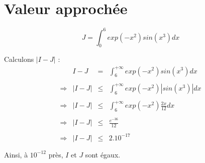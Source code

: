 \section{Valeur approchée}
\[
  J = \int_{0}^{6}exp(-x^2)sin(x^3)dx
\]

Calculons $|I-J|$ :
\[
  \begin{array}{rrcl}
                & I-J   & =    & \int_{6}^{+\infty}exp(-x^2)sin(x^3)dx      \\\\
    \Rightarrow & |I-J| & \leq & \int_{6}^{+\infty}exp(-x^2)|sin(x^3)|dx    \\\\
    \Rightarrow & |I-J| & \leq & \int_{6}^{+\infty}exp(-x^2)\frac{2x}{12}dx \\\\
    \Rightarrow & |I-J| & \leq & \frac{e^{-36}}{12}                         \\\\
    \Rightarrow & |I-J| & \leq & 2.10^{-17}                                 \\\\
  \end{array}
\]
Ainsi, à $10^{-12}$ près, $I$ et $J$ sont égaux.
